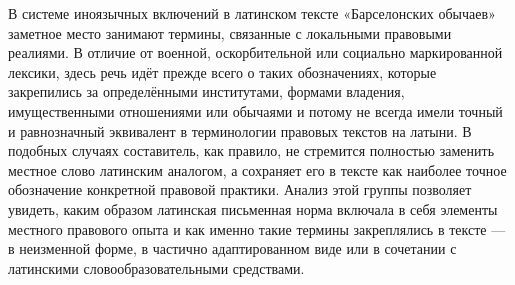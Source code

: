 В системе иноязычных включений в латинском тексте «Барселонских обычаев» заметное место занимают термины, связанные с локальными правовыми реалиями. В отличие от военной, оскорбительной или социально маркированной лексики, здесь речь идёт прежде всего о таких обозначениях, которые закрепились за определёнными институтами, формами владения, имущественными отношениями или обычаями и потому не всегда имели точный и равнозначный эквивалент в терминологии правовых текстов на латыни. В подобных случаях составитель, как правило, не стремится полностью заменить местное слово латинским аналогом, а сохраняет его в тексте как наиболее точное обозначение конкретной правовой практики. Анализ этой группы позволяет увидеть, каким образом латинская письменная норма включала в себя элементы местного правового опыта и как именно такие термины закреплялись в тексте --- в неизменной форме, в частично адаптированном виде или в сочетании с латинскими словообразовательными средствами.

